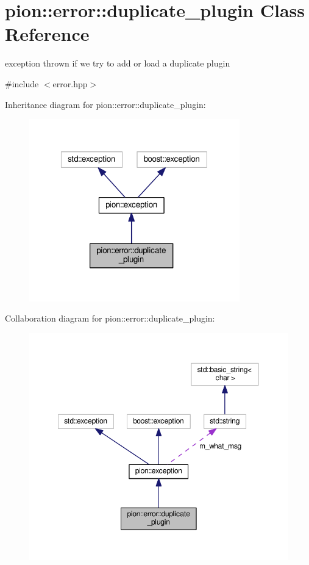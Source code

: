 \hypertarget{classpion_1_1error_1_1duplicate__plugin}{\section{pion\-:\-:error\-:\-:duplicate\-\_\-plugin Class Reference}
\label{classpion_1_1error_1_1duplicate__plugin}
}


exception thrown if we try to add or load a duplicate plugin  




{\ttfamily \#include $<$error.\-hpp$>$}



Inheritance diagram for pion\-:\-:error\-:\-:duplicate\-\_\-plugin\-:
\nopagebreak
\begin{figure}[H]
\begin{center}
\leavevmode
\includegraphics[width=259pt]{classpion_1_1error_1_1duplicate__plugin__inherit__graph}
\end{center}
\end{figure}


Collaboration diagram for pion\-:\-:error\-:\-:duplicate\-\_\-plugin\-:
\nopagebreak
\begin{figure}[H]
\begin{center}
\leavevmode
\includegraphics[width=350pt]{classpion_1_1error_1_1duplicate__plugin__coll__graph}
\end{center}
\end{figure}
